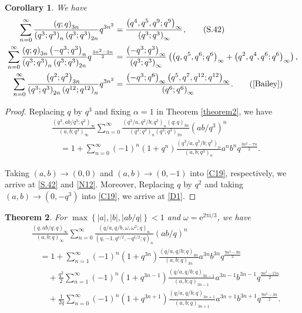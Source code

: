 \documentclass[reqno,12pt]{amsart}
\newtheorem{theorem}{Theorem}[section]%
\newtheorem{corollary}[theorem]{Corollary}
\theoremstyle{remark}
\numberwithin{equation}{section}
\begin{document}
\begin{corollary}
We have
\begin{align}
\sum_{n=0}^{\infty}\frac{\left(q;q\right)_{3n}}{\left(q^3;q^3\right)_n\left(q^3;q^3\right)_{2n}}q^{3n^2}
&=\frac{\left(q^4,q^5,q^9;q^9\right)_{\infty}}{\left(q^3;q^3\right)_{\infty}},\tag{S.42}\label{S.42}\\
\sum_{n=0}^{\infty}\frac{\left(q;q\right)_{3n}\left(-q^3;q^3\right)_n}{\left(q^3;q^3\right)_n\left(q^3;q^3\right)_{2n}}q^{\frac{3n^2-3n}{2}}
&=\frac{\left(-q^3;q^3\right)_{\infty}}{\left(q^3;q^3\right)_{\infty}}
\left(\left(q,q^5,q^6;q^6\right)_{\infty}+\left(q^2,q^4,q^6;q^6\right)_{\infty}\right),\label{N12}\\
\sum_{n=0}^{\infty}\frac{\left(q^2;q^2\right)_{3n}}{\left(q^3;q^3\right)_{2n}\left(q^{12};q^{12}\right)_{n}}q^{3n^2}
&=\frac{\left(-q^3;q^6\right)_{\infty}\left(q^5,q^7,q^{12};q^{12}\right)_{\infty}}{\left(q^6;q^6\right)_{\infty}}
.\tag{\rm{\cite[Eq. (7.5)]{Bailey}}}\label{D1}
\end{align}
\end{corollary}
\begin{proof}
Replacing $q$ by $q^3$ and fixing $\alpha=1$ in Theorem \ref{theorem2}, we have
\begin{align}
&\frac{\left(q^3,ab/q^3;q^3\right)_{\infty}}{\left(a,b;q^3\right)_{\infty}}
\sum_{n=0}^{\infty}\frac{\left(q^3/a,q^3/b;q^3\right)_n\left(q;q\right)_{3n}}
{\left(q^3;q^3\right)_n\left(q^3;q^3\right)_{2n}}\left(ab/q^3\right)^n\nonumber\\
&\quad=
1+\sum_{n=0}^{\infty}\left(-1\right)^n\left(1+q^n\right)\frac{\left(q^3/a,q^3/b;q^3\right)_n}{\left(a,b;q^3\right)_n}
a^nb^nq^{\frac{3n^2-7n}{2}}.\label{C19}
\end{align}

Taking $\left(a,b\right)\to\left(0,0\right)$ and $\left(a,b\right)\to\left(0,-1\right)$  into \eqref{C19}, respectively, we arrive at \eqref{S.42} and \eqref{N12}. Moreover,
Replacing $q$ by $q^2$ and taking $\left(a,b\right)\to\left(0,-q^3\right)$ into \eqref{C19}, we arrive at \ref{D1}.
\end{proof}
\begin{theorem}\label{thm4}
For $\max\left\{|a|, |b|, |ab/q|\right\}<1$ and  $\omega=\mathrm{e^{2\pi\mathrm{i}/3}}$, we have
\begin{align*}
&\frac{\left(q,ab/q;q\right)_{\infty}}{\left(a,b;q\right)_{\infty}}
\sum_{n=0}^{\infty}
\frac{\left(q/a,q/b,\omega,\omega^2;q\right)_n}
{\left(q,-1,q^{1/2},-q^{1/2};q\right)_n}\left(ab/q\right)^n\\
&\quad=1+\sum_{n=1}^{\infty}\left(-1\right)^n\left(1+q^{3n}\right)
\frac{\left(q/a,q/b;q\right)_{3n}}
{\left(a,b;q\right)_{3n}}
a^{3n}b^{3n}q^{\frac{9n^2-9n}{2}}\\
&\qquad+\frac{q^2}{2}\sum_{n=1}^{\infty}\left(-1\right)^n\left(1+q^{3n-1}\right)
\frac{\left(q/a,q/b;q\right)_{3n-1}}
{\left(a,b;q\right)_{3n-1}}
a^{3n-1}b^{3n-1}q^{\frac{9n^2-15n}{2}}\\
&\qquad+\frac{1}{2q}\sum_{n=0}^{\infty}\left(-1\right)^n\left(1+q^{3n+1}\right)
\frac{\left(q/a,q/b;q\right)_{3n+1}}
{\left(a,b;q\right)_{3n+1}}
a^{3n+1}b^{3n+1}q^{\frac{9n^2-3n}{2}}
.
\end{align*}
\end{theorem}
\end{document}
